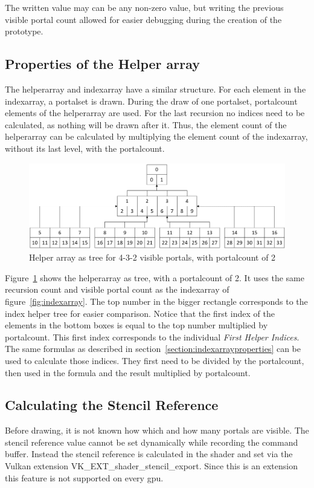 The written value may can be any non-zero value, but writing the previous visible portal count allowed for easier debugging during the creation of the prototype.

\subsection{Properties of the Helper array}
\label{section:helperarrayproperties}
The \gls{helperarray} and \gls{indexarray} have a similar structure. For each element in the \gls{indexarray}, a \gls{portalset} is drawn. During the draw of one \gls{portalset}, \gls{portalcount} elements of the \gls{helperarray} are used. For the last recursion no indices need to be calculated, as nothing will be drawn after it. Thus, the element count of the \gls{helperarray} can be calculated by multiplying the element count of the \gls{indexarray}, without its last level, with the \gls{portalcount}.

\begin{figure}[h]
	\includegraphics[width=\linewidth]{images/helperarray.png}
	\caption{Helper array as tree for 4-3-2 visible portals, with \gls{portalcount} of 2}
	\label{fig:helperarray}
\end{figure}

Figure~\ref{fig:helperarray} shows the \gls{helperarray} as tree, with a \gls{portalcount} of 2. It uses the same recursion count and visible portal count as the \gls{indexarray} of figure~\ref{fig:indexarray}. The top number in the bigger rectangle corresponds to the index helper tree for easier comparison. Notice that the first index of the elements in the bottom boxes is equal to the top number multiplied by \gls{portalcount}. This first index corresponds to the individual \textit{First Helper Indices}. The same formulas as described in section~\ref{section:indexarrayproperties} can be used to calculate those indices. They first need to be divided by the \gls{portalcount}, then used in the formula and the result multiplied by \gls{portalcount}.


\subsection{Calculating the Stencil Reference}
Before drawing, it is not known how which and how many portals are visible. The stencil reference value cannot be set dynamically while recording the command buffer. Instead the stencil reference is calculated in the shader and set via the Vulkan extension VK\_EXT\_shader\_stencil\_export. Since this is an extension this feature is not supported on every \gls{gpu}.

